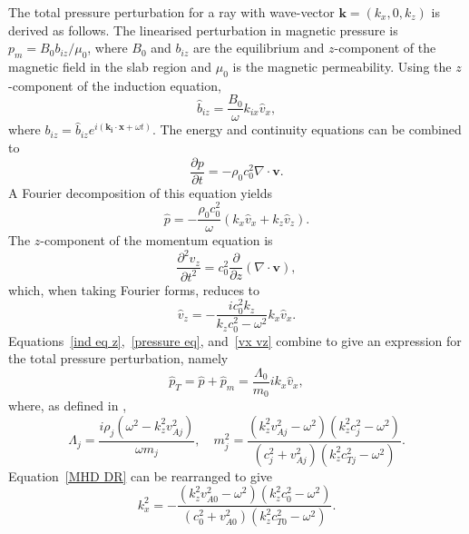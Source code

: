 	The total pressure perturbation for a ray with wave-vector $\mathbf{k} = (k_x, 0, k_z)$ is derived as follows. The linearised perturbation in magnetic pressure is $p_m = B_0b_{iz}/\mu_0$, where $B_0$ and $b_{iz}$ are the equilibrium and $z$-component of the magnetic field in the slab region and $\mu_0$ is the magnetic permeability. Using the $z$-component of the induction equation,
	\begin{equation}
	\widehat{b}_{iz} = \frac{B_0}{\omega}k_{ix}\widehat{v}_x, \label{ind eq z}
	\end{equation}
	where $b_{iz} = \widehat{b}_{iz} e^{i(\mathbf{k_i}\cdot \mathbf{x} + \omega t)}$. The energy and continuity equations can be combined to
	\begin{equation}
	\frac{\partial p}{\partial t} = - \rho_0 c_0^2 \nabla \cdot \mathbf{v}.
	\end{equation}
	A Fourier decomposition of this equation yields
	\begin{equation}
	\widehat{p} = -\frac{\rho_0c_0^2}{\omega} (k_x\widehat{v}_x + k_z\widehat{v}_z). \label{pressure eq}
	\end{equation}
	The $z$-component of the momentum equation is
	\begin{equation}
	\frac{\partial^2 v_z}{\partial t^2} = c_0^2 \frac{\partial}{\partial z}(\nabla \cdot \mathbf{v}),
	\end{equation}
	which, when taking Fourier forms, reduces to
	\begin{equation}
	\widehat{v}_z = - \frac{ic_0^2k_z}{k_zc_0^2 - \omega^2}k_x\widehat{v}_x. \label{vx vz}
	\end{equation}
	Equations~\eqref{ind eq z},~\eqref{pressure eq}, and~\eqref{vx vz} combine to give an expression for the total pressure perturbation, namely
	\begin{equation}
	\widehat{p}_T = \widehat{p} + \widehat{p}_m = \frac{\Lambda_0}{m_0}ik_x\widehat{v}_x,
	\end{equation}
	where, as defined in \cite{all_etal17},
	\begin{equation}
	\Lambda_j = \frac{i\rho_j(\omega^2 - k_z^2v_{Aj}^2)}{\omega m_j}, \quad m_j^2 = \frac{(k_z^2 v_{Aj}^2 - \omega^2)(k_z^2 c_{j}^2 - \omega^2)}{(c_j^2 + v_{Aj}^2)(k_z^2 c_{Tj}^2 - \omega^2)}.
	\end{equation}
	Equation~\eqref{MHD DR} can be rearranged to give
	\begin{equation}
	k_x^2 = -\frac{(k_z^2 v_{A0}^2 - \omega^2)(k_z^2 c_{0}^2 - \omega^2)}{(c_0^2 + v_{A0}^2)(k_z^2 c_{T0}^2 - \omega^2)}.
	\end{equation}
